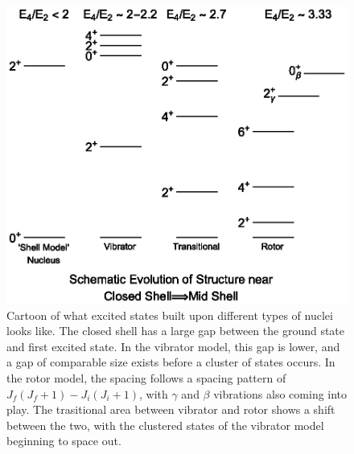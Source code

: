 \begin{figure}
    \centering
    \includegraphics[scale=1]{Introduction_Figs/ShellStructureEvolution.eps}
    \caption{Cartoon of what excited states built upon different types of nuclei looks like. The closed shell has a large gap between the ground state and first excited state. In the vibrator model, this gap is lower, and a gap of comparable size exists before a cluster of states occurs. In the rotor model, the spacing follows a spacing pattern of $J_f(J_f+1)-J_i(J_i+1)$, with $\gamma$ and $\beta$ vibrations also coming into play. The trasitional area between vibrator and rotor shows a shift between the two, with the clustered states of the vibrator model beginning to space out.}
    \label{fig:statestructure}
\end{figure}